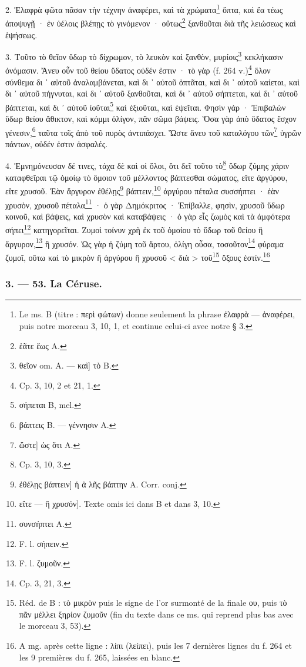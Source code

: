 \documentclass[a4paper, 11pt, oneside, polutonikogreek, french]{article}
\begin{document}
2. Ἐλαφρὰ φῶτα πᾶσαν τὴν τέχνην ἀναφέρει, καὶ τὰ χρώματα\footnote{Le ms. B (titre : περὶ φώτων) donne seulement la phrase ἐλαφρὰ --- ἀναφέρει, puis notre morceau 3, 10, 1, et continue celui-ci avec notre § 3.} ὄπτα, καὶ ἔα τέως ἀποψυγῇ · ἐν ὑέλοις βλέπῃς τὸ γινόμενον · οὕτως\footnote{ἑᾶτε ἕως A.} ξανθοῦται διὰ τῆς λειώσεως καὶ ἑψήσεως.

3. Τοῦτο τὸ θεῖον ὕδωρ τὸ δίχρωμον, τὸ λευκὸν καὶ ξανθὸν, μυρίοις\footnote{θεῖον om. A. --- καὶ] τὸ B.} κεκλήκασιν ὀνόμασιν. Ἄνευ οὖν τοῦ θείου ὕδατος οὐδέν ἐστιν · τὸ γὰρ (f. 264 v.)\footnote{Cp. 3, 10, 2 et 21, 1.} ὅλον σύνθεμα δι ᾽ αὐτοῦ ἀναλαμβάνεται, καὶ δι ᾽ αὐτοῦ ὀπτᾶται, καὶ δι ᾽ αὐτοῦ καίεται, καὶ δι ᾽ αὐτοῦ πήγνυται, καὶ δι ᾽ αὐτοῦ ξανθοῦται, καὶ δι ᾽ αὐτοῦ σήπτεται, καὶ δι ᾽ αὐτοῦ βάπτεται, καὶ δι ᾽ αὐτοῦ ἰοῦται\footnote{σήπεται B, mel.} καὶ ἐξιοῦται, καὶ ἑψεῖται. Φησὶν γάρ · Ἐπιβαλὼν ὕδωρ θείου ἄθικτον, καὶ κόμμι ὀλίγον, πᾶν σῶμα βάψεις. Ὅσα γὰρ ἀπὸ ὕδατος ἔσχον γένεσιν,\footnote{βάπτεις B. --- γέννησιν A.} ταῦτα τοῖς ἀπὸ τοῦ πυρὸς ἀντιπάσχει. Ὥστε ἄνευ τοῦ καταλόγου τῶν\footnote{ὥστε] ὡς ὅτι A.} ὑγρῶν πάντων, οὐδέν ἐστιν ἀσφαλές.

4. Ἐμνημόνευσαν δέ τινες, τάχα δὲ καὶ οἱ ὅλοι, ὅτι δεῖ τοῦτο τὸ\footnote{Cp. 3, 10, 3.} ὕδωρ ζύμης χάριν καταφθεῖραι τῷ ὁμοίῳ τὸ ὅμοιον τοῦ μέλλοντος βάπτεσθαι σώματος, εἴτε ἀργύρου, εἴτε χρυσοῦ. Ἐὰν ἄργυρον ἐθέλῃς\footnote{ἐθέλῃς βάπτειν] ἡ ἀ λῆς βάπτην A. Corr. conj.} βάπτειν,\footnote{εἴτε --- ἢ χρυσόν]. Texte omis ici dans B et dans 3, 10.} ἀργύρου πέταλα συσσήπτει · ἐὰν χρυσὸν, χρυσοῦ πέταλα\footnote{συνσήπτει A.} · ὁ γὰρ Δημόκριτος · Ἐπίβαλλε, φησὶν, χρυσοῦ ὕδωρ κοινοῦ, καὶ βάψεις, καὶ χρυσὸν καὶ καταβάψεις · ὁ γὰρ εἷς ζωμὸς καὶ τὰ ἀμφότερα σήπει\footnote{F. l. σήπειν.} κατηγορεῖται. Ζυμοὶ τοίνυν χρὴ ἐκ τοῦ ὁμοίου τὸ ὕδωρ τοῦ θείου ἢ ἄργυρον,\footnote{F. l. ζυμοῦν.} ἢ χρυσόν. Ὡς γὰρ ἡ ζύμη τοῦ ἄρτου, ὀλίγη οὖσα, τοσοῦτον\footnote{Cp. 3, 21, 3.} φύραμα ζυμοῖ, οὕτω καὶ τὸ μικρὸν ἢ ἀργύρου ἢ χρυσοῦ < διὰ > τοῦ\footnote{Réd. de B : τὸ μικρὸν puis le signe de l'or surmonté de la finale ου, puis τὸ πᾶν μέλλει ξηρίον ζυμοῦν (fin du texte dans ce ms. qui reprend plus bas avec le morceau 3, 53).} ὄξους ἐστίν.\footnote{A mg. après cette ligne : λίπι (λείπει), puis les 7 dernières lignes du f. 264 et les 9 premières du f. 265, laissées en blanc.}

\bigskip
\centerline{\EightStarTaper}
\centerline{\EightStarTaper\EightStarTaper}
\bigskip

\subsubsection{3. --- 53. La Céruse.}
\end{document}

